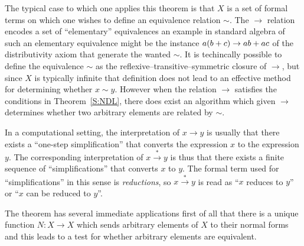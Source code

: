 \documentclass[12pt]{article}
\theoremstyle{definition}
\newtheorem{definition}{Definition}
\providecommand*{\Dash}{%
   \hspace*{0.166667em}\textemdash\hspace{0.166667em}%
}
\providecommand*{\Ldash}{%
   \hspace{0.166667em}\textemdash\hspace*{0.166667em}%
}
\begin{document}
The typical case to which one applies this theorem is that $X$ is a 
set of formal terms on which one wishes to define an equivalence 
relation $\sim$. The $\rightarrow$ relation encodes a set of 
``elementary'' equivalences\Ldash an example in standard algebra of 
such an elementary equivalence might be the instance 
\(a(b +\nobreak c) \rightarrow ab + ac\) of the distributivity 
axiom\Dash that generate the wanted $\sim$. It is 
techincally possible to define the equivalence $\sim$ as the 
reflexive--transitive--symmetric closure of $\rightarrow$, but 
since $X$ is typically infinite that definition does not lead to 
an effective method for determining whether \(x \sim y\). However 
when the relation $\rightarrow$ satisfies the conditions in 
Theorem~\ref{S:NDL}, there does exist an algorithm which given 
$\rightarrow$ determines whether two arbitrary elements are related 
by $\sim$.

In a computational setting, the interpretation of \(x \rightarrow y\) 
is usually that there exists a ``one-step simplification'' that 
converts the expression $x$ to the expression $y$. The corresponding 
interpretation of \(x \stackrel{*}{\rightarrow} y\) is thus that 
there exists a finite sequence of ``simplifications'' that converts 
$x$ to $y$. The formal term used for ``simplifications'' in this 
sense is \emph{reductions}, so \(x \stackrel{*}{\rightarrow} y\) is 
read as ``$x$ reduces to $y$'' or ``$x$ can be reduced to $y$''. 

%  
%

The theorem has several immediate 
applications\Ldash first of all that there is a unique function 
\(N\colon X \longrightarrow X\) which sends arbitrary elements of 
$X$ to their normal forms\Dash and this leads to a test for whether 
arbitrary elements are equivalent.
\end{document}
